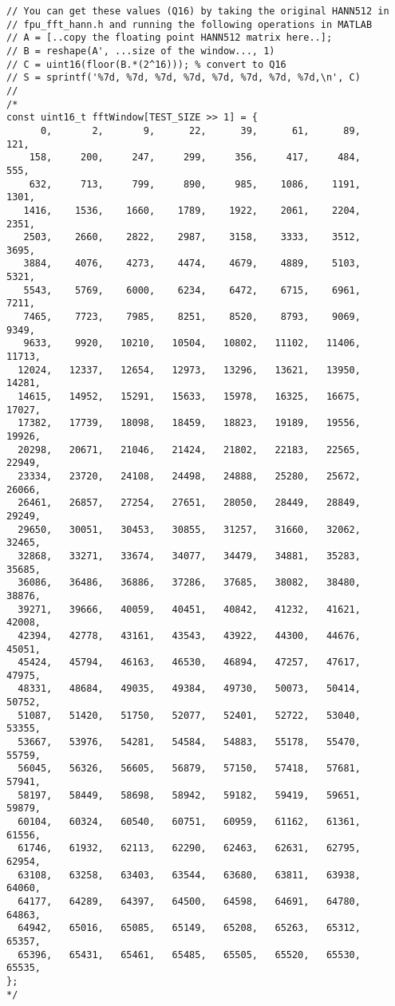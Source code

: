 \begin{lstlisting}[caption=\raggedright{mcu-libs/RLS.h}, frame=single]
// You can get these values (Q16) by taking the original HANN512 in
// fpu_fft_hann.h and running the following operations in MATLAB
// A = [..copy the floating point HANN512 matrix here..];
// B = reshape(A', ...size of the window..., 1)
// C = uint16(floor(B.*(2^16))); % convert to Q16
// S = sprintf('%7d, %7d, %7d, %7d, %7d, %7d, %7d, %7d,\n', C)
//
/*
const uint16_t fftWindow[TEST_SIZE >> 1] = {
      0,       2,       9,      22,      39,      61,      89,     121,
    158,     200,     247,     299,     356,     417,     484,     555,
    632,     713,     799,     890,     985,    1086,    1191,    1301,
   1416,    1536,    1660,    1789,    1922,    2061,    2204,    2351,
   2503,    2660,    2822,    2987,    3158,    3333,    3512,    3695,
   3884,    4076,    4273,    4474,    4679,    4889,    5103,    5321,
   5543,    5769,    6000,    6234,    6472,    6715,    6961,    7211,
   7465,    7723,    7985,    8251,    8520,    8793,    9069,    9349,
   9633,    9920,   10210,   10504,   10802,   11102,   11406,   11713,
  12024,   12337,   12654,   12973,   13296,   13621,   13950,   14281,
  14615,   14952,   15291,   15633,   15978,   16325,   16675,   17027,
  17382,   17739,   18098,   18459,   18823,   19189,   19556,   19926,
  20298,   20671,   21046,   21424,   21802,   22183,   22565,   22949,
  23334,   23720,   24108,   24498,   24888,   25280,   25672,   26066,
  26461,   26857,   27254,   27651,   28050,   28449,   28849,   29249,
  29650,   30051,   30453,   30855,   31257,   31660,   32062,   32465,
  32868,   33271,   33674,   34077,   34479,   34881,   35283,   35685,
  36086,   36486,   36886,   37286,   37685,   38082,   38480,   38876,
  39271,   39666,   40059,   40451,   40842,   41232,   41621,   42008,
  42394,   42778,   43161,   43543,   43922,   44300,   44676,   45051,
  45424,   45794,   46163,   46530,   46894,   47257,   47617,   47975,
  48331,   48684,   49035,   49384,   49730,   50073,   50414,   50752,
  51087,   51420,   51750,   52077,   52401,   52722,   53040,   53355,
  53667,   53976,   54281,   54584,   54883,   55178,   55470,   55759,
  56045,   56326,   56605,   56879,   57150,   57418,   57681,   57941,
  58197,   58449,   58698,   58942,   59182,   59419,   59651,   59879,
  60104,   60324,   60540,   60751,   60959,   61162,   61361,   61556,
  61746,   61932,   62113,   62290,   62463,   62631,   62795,   62954,
  63108,   63258,   63403,   63544,   63680,   63811,   63938,   64060,
  64177,   64289,   64397,   64500,   64598,   64691,   64780,   64863,
  64942,   65016,   65085,   65149,   65208,   65263,   65312,   65357,
  65396,   65431,   65461,   65485,   65505,   65520,   65530,   65535,
};
*/


\end{lstlisting}
